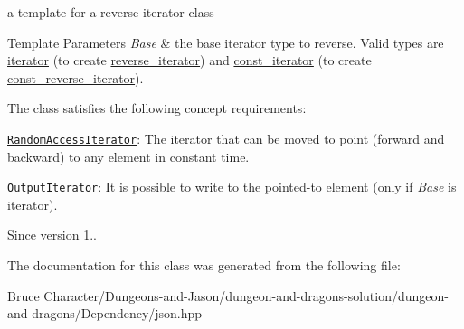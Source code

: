 a template for a reverse iterator class 


\begin{DoxyTemplParams}{Template Parameters}
{\em Base} & the base iterator type to reverse. Valid types are \hyperlink{classnlohmann_1_1basic__json_1_1iterator}{iterator} (to create \hyperlink{classnlohmann_1_1basic__json_a2f1f83aa187a56dc5ec7a7027065ac8a}{reverse\+\_\+iterator}) and \hyperlink{classnlohmann_1_1basic__json_1_1const__iterator}{const\+\_\+iterator} (to create \hyperlink{classnlohmann_1_1basic__json_ae336fff01f4b78e3e16e5008dc8dbc00}{const\+\_\+reverse\+\_\+iterator}).\\
\hline
\end{DoxyTemplParams}
The class satisfies the following concept requirements\+:
\begin{DoxyItemize}
\item \href{http://en.cppreference.com/w/cpp/concept/RandomAccessIterator}{\tt Random\+Access\+Iterator}\+: The iterator that can be moved to point (forward and backward) to any element in constant time.
\item \href{http://en.cppreference.com/w/cpp/concept/OutputIterator}{\tt Output\+Iterator}\+: It is possible to write to the pointed-\/to element (only if {\itshape Base} is \hyperlink{classnlohmann_1_1basic__json_1_1iterator}{iterator}).
\end{DoxyItemize}

\begin{DoxySince}{Since}
version 1.. 
\end{DoxySince}


The documentation for this class was generated from the following file\+:\begin{DoxyCompactItemize}
\item 
Bruce Character/\+Dungeons-\/and-\/\+Jason/dungeon-\/and-\/dragons-\/solution/dungeon-\/and-\/dragons/\+Dependency/json.\+hpp\end{DoxyCompactItemize}
